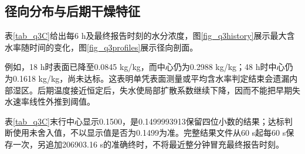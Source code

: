 \subsection{径向分布与后期干燥特征}
表\ref{tab_q3C}给出每6 h及最终报告时刻的水分浓度，图\ref{fig_q3history}展示最大含水率随时间的变化，图\ref{fig_q3profiles}展示径向剖面。


例如，18 h时表面已降至0.0845 kg/kg，而中心仍为0.2988 kg/kg；48 h时中心仍为0.1618 kg/kg，尚未达标。这表明单凭表面测量或平均含水率判定结束会遗漏内部湿区。后期温度接近恒定后，失水使局部扩散系数继续下降，因而不能把早期失水速率线性外推到阈值。

表\ref{tab_q3C}末行中心显示0.1500，是0.1499993913保留四位小数的结果；达标判断使用未舍入值，不以显示值是否为0.1499为准。完整结果文件从60 s起每60 s保存一次，另追加206903.16 s的准确终时，不将最近整分钟冒充最终报告时刻。
\FloatBarrier
